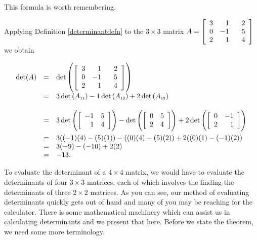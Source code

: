 This formula is worth remembering.

\smallskip

Applying Definition \ref{determinantdefn} to the $3 \times 3$ matrix $A =  \left[ \begin{array}{rrr} 3 & 1 & \hphantom{-}2 \\ 0 & -1 & 5 \\ 2 & 1 & 4 \\ \end{array} \right]$ we obtain

\[ \begin{array}{rcl} 

\det(A) & = & \det \left( \left[ \begin{array}{rrr} 3 & 1 & \hphantom{-}2 \\ 0 & -1 & 5 \\ 2 & 1 & 4 \\ \end{array} \right] \right)\\[13pt]
& = & 3\det\left(A_{\mbox{\tiny$11$}}\right) - 1\det\left(A_{\mbox{\tiny$12$}}\right) + 2\det\left(A_{\mbox{\tiny$13$}}\right) \\[13pt]
& = & 3\det \left( \left[ \begin{array}{rr} -1 & 5 \\ 1 & 4 \\ \end{array} \right] \right) - \det \left( \left[ \begin{array}{rr} 0 & 5 \\ 2 & 4 \\ \end{array} \right] \right) + 2 \det \left( \left[ \begin{array}{rr} 0 & -1 \\ 2 & 1 \\ \end{array} \right] \right) \\[13pt]
& = & 3((-1)(4) - (5)(1)) - ((0)(4)-(5)(2))+2((0)(1)-(-1)(2)) \\
& = & 3(-9)-(-10)+2(2) \\
& = & -13. \\ \end{array}  \]

To evaluate the determinant of a $4 \times 4$ matrix, we would have to evaluate the determinants of four $3 \times 3$ matrices, each of which involves the finding the determinants of three $2 \times 2$ matrices. As you can see, our method of evaluating determinants quickly gets out of hand and many of you may be reaching for the calculator.  There is some mathematical machinery which can assist us in calculating determinants and we present that here.  Before we state the theorem, we need some more terminology.

